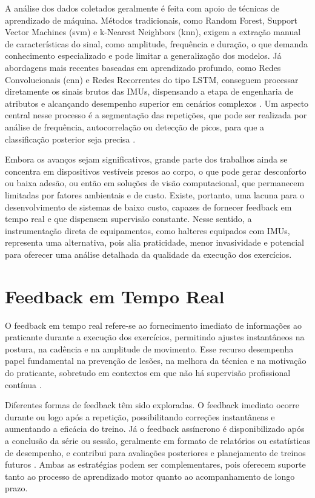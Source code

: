 A análise dos dados coletados geralmente é feita com apoio de técnicas de aprendizado de máquina. Métodos tradicionais, como Random Forest, Support Vector Machines (\gls{svm}) e k-Nearest Neighbors (\gls{knn}), exigem a extração manual de características do sinal, como amplitude, frequência e duração, o que demanda conhecimento especializado e pode limitar a generalização dos modelos. Já abordagens mais recentes baseadas em aprendizado profundo, como Redes Convolucionais (\gls{cnn}) e Redes Recorrentes do tipo LSTM, conseguem processar diretamente os sinais brutos das IMUs, dispensando a etapa de engenharia de atributos e alcançando desempenho superior em cenários complexos \cite{gupta-yogahelp-2021,dzaja-quantitative-nodate}. Um aspecto central nesse processo é a segmentação das repetições, que pode ser realizada por análise de frequência, autocorrelação ou detecção de picos, para que a classificação posterior seja precisa \cite{dzaja-quantitative-nodate}.  

Embora os avanços sejam significativos, grande parte dos trabalhos ainda se concentra em dispositivos vestíveis presos ao corpo, o que pode gerar desconforto ou baixa adesão, ou então em soluções de visão computacional, que permanecem limitadas por fatores ambientais e de custo. Existe, portanto, uma lacuna para o desenvolvimento de sistemas de baixo custo, capazes de fornecer feedback em tempo real e que dispensem supervisão constante. Nesse sentido, a instrumentação direta de equipamentos, como halteres equipados com IMUs, representa uma alternativa, pois alia praticidade, menor invasividade e potencial para oferecer uma análise detalhada da qualidade da execução dos exercícios.

\section{Feedback em Tempo Real}

O feedback em tempo real refere-se ao fornecimento imediato de informações ao praticante durante a execução dos exercícios, permitindo ajustes instantâneos na postura, na cadência e na amplitude de movimento. Esse recurso desempenha papel fundamental na prevenção de lesões, na melhora da técnica e na motivação do praticante, sobretudo em contextos em que não há supervisão profissional contínua \cite{balkhi-multipurpose-nodate,dzaja-quantitative-nodate}.  

Diferentes formas de feedback têm sido exploradas. O feedback imediato ocorre durante ou logo após a repetição, possibilitando correções instantâneas e aumentando a eficácia do treino. Já o feedback assíncrono é disponibilizado após a conclusão da série ou sessão, geralmente em formato de relatórios ou estatísticas de desempenho, e contribui para avaliações posteriores e planejamento de treinos futuros \cite{chen-analysis-2024,dzaja-quantitative-nodate}. Ambas as estratégias podem ser complementares, pois oferecem suporte tanto ao processo de aprendizado motor quanto ao acompanhamento de longo prazo.  

